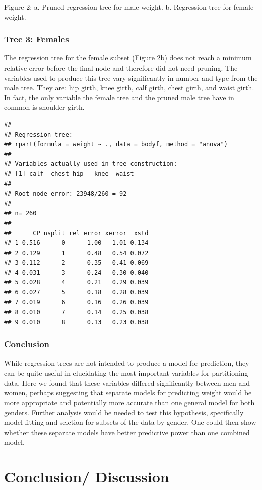 \documentclass[11pt]{article}\usepackage[]{graphicx}\usepackage[]{color}
\makeatletter
\newenvironment{kframe}{%
 \def\at@end@of@kframe{}%
 \ifinner\ifhmode%
  \def\at@end@of@kframe{\end{minipage}}%
  \begin{minipage}{\columnwidth}%
 \fi\fi%
 \def\FrameCommand##1{\hskip\@totalleftmargin \hskip-\fboxsep
 \colorbox{shadecolor}{##1}\hskip-\fboxsep
     \hskip-\linewidth \hskip-\@totalleftmargin \hskip\columnwidth}%
 \MakeFramed {\advance\hsize-\width
   \@totalleftmargin\z@ \linewidth\hsize
   \@setminipage}}%
 {\par\unskip\endMakeFramed%
 \at@end@of@kframe}
\newenvironment{knitrout}{}{} %
\makeatother
\begin{document}
\caption{Figure 2: a. Pruned regression tree for male weight. b. Regression tree for female weight.}

\subsubsection{Tree 3: Females} 
The regression tree for the female subset (Figure 2b) does not reach a minimum relative error before the final node and therefore did not need pruning. The variables used to produce this tree vary significantly in number and type from the male tree. They are: hip girth, knee girth, calf girth, chest girth, and waist girth. In fact, the only variable the female tree and the pruned male tree have in common is shoulder girth.

\begin{knitrout}
\color{fgcolor}\begin{kframe}
\begin{verbatim}
## 
## Regression tree:
## rpart(formula = weight ~ ., data = bodyf, method = "anova")
## 
## Variables actually used in tree construction:
## [1] calf  chest hip   knee  waist
## 
## Root node error: 23948/260 = 92
## 
## n= 260 
## 
##      CP nsplit rel error xerror  xstd
## 1 0.516      0      1.00   1.01 0.134
## 2 0.129      1      0.48   0.54 0.072
## 3 0.112      2      0.35   0.41 0.069
## 4 0.031      3      0.24   0.30 0.040
## 5 0.028      4      0.21   0.29 0.039
## 6 0.027      5      0.18   0.28 0.039
## 7 0.019      6      0.16   0.26 0.039
## 8 0.010      7      0.14   0.25 0.038
## 9 0.010      8      0.13   0.23 0.038
\end{verbatim}
\end{kframe}
\end{knitrout}


\subsubsection{Conclusion}
While regression trees are not intended to produce a model for prediction, they can be quite useful in elucidating the most important variables for partitioning data. Here we found that these variables differed significantly between men and women, perhaps suggesting that separate models for predicting weight would be more appropriate and potentially more accurate than one general model for both genders. Further analysis would be needed to test this hypothesis, specifically model fitting and selction for subsets of the data by gender. One could then show whether these separate models have better predictive power than one combined model.


\newpage

\section{Conclusion/ Discussion}
\end{document}
